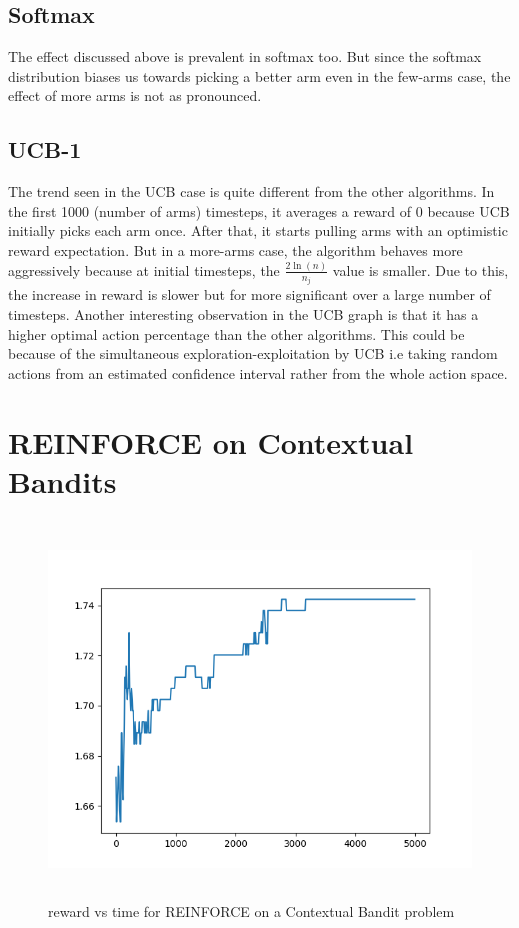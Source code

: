 \documentclass[12pt]{extarticle}
\begin{document}
\subsection{Softmax}
The effect discussed above is prevalent in softmax too. But since the softmax distribution biases us towards picking a better arm even in the few-arms case, the effect of more arms is not as pronounced.

\subsection{UCB-1}
The trend seen in the UCB case is quite different from the other algorithms. In the first 1000 (number of arms) timesteps, it averages a reward of 0 because UCB initially picks each arm once. After that, it starts pulling arms with an optimistic reward expectation. But in a more-arms case, the algorithm behaves more aggressively because at initial timesteps, the $\frac{2\ln(n)}{n_j}$ value is smaller. Due to this, the increase in reward is slower but for more significant over a large number of timesteps.
Another interesting observation in the UCB graph is that it has a higher optimal action percentage than the other algorithms. This could be because of the simultaneous exploration-exploitation by UCB i.e taking random actions from an estimated confidence interval rather from the whole action space.

\section{REINFORCE on Contextual Bandits}
\begin{figure}[H]
	\includegraphics[width=\textwidth, height=10cm]{reinforce.png}
	\caption{reward vs time for REINFORCE on a Contextual Bandit problem}
	\label{fig:reinforce}
\end{figure}
 
\end{document}

